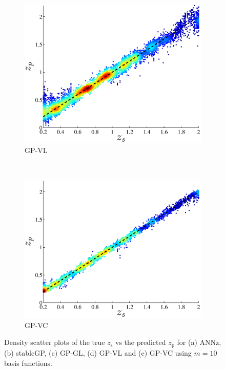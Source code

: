 \documentclass[useAMS,usenatbib,fleqn]{mn2e}
\begin{document}
\begin{figure}
        \begin{subfigure}[b]{0.3\textwidth}
               \includegraphics[width=\textwidth]{figures/GPVL.eps}
                \caption{GP-VL}
        \end{subfigure}
        ~
        \begin{subfigure}[b]{0.3\textwidth}
                \includegraphics[width=\textwidth]{figures/GPVC.eps}
                \caption{GP-VC}
        \end{subfigure}
        
        \caption{Density scatter plots of the true $z_\textrm{s}$ vs the predicted $z_\textrm{p}$ for (a) ANNz, (b) stableGP, (c) GP-GL, (d) GP-VL and (e) GP-VC using $m=10$ basis functions.}
        \label{fig-experiment-1}
\end{figure}
\end{document}
